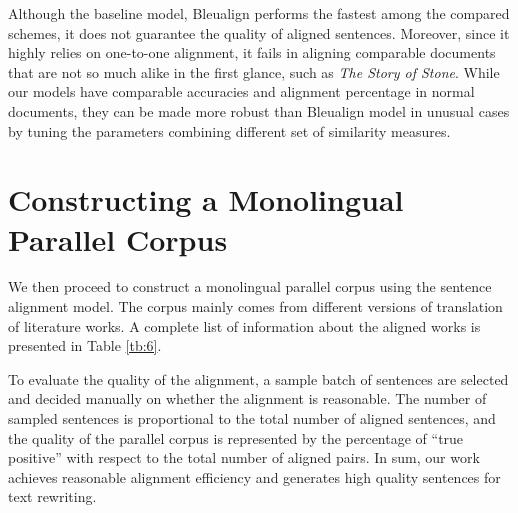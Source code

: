 \documentclass[runningheads]{llncs}
\begin{document}
Although the baseline model, Bleualign performs the fastest among the compared schemes, it does not guarantee the quality of aligned sentences. Moreover, since it highly relies on one-to-one alignment, it fails in aligning comparable documents that are not so much alike in the first glance, such as \emph{The Story of Stone}. While our models have comparable accuracies and alignment percentage in normal documents, they can be made more robust than Bleualign model in unusual cases by tuning the parameters combining different set of similarity measures.

\section{Constructing a Monolingual Parallel Corpus}

We then proceed to construct a monolingual parallel corpus using the sentence alignment model. The corpus mainly comes from different versions of translation of literature works. A complete list of information about the aligned works is presented in Table \ref{tb:6}.

To evaluate the quality of the alignment, a sample batch of sentences are selected and decided manually on whether the alignment is reasonable. The number of sampled sentences is proportional to the total number of aligned sentences, and the quality of the parallel corpus is represented by the percentage of ``true positive'' with respect to the total number of aligned pairs. In sum, our work achieves reasonable alignment efficiency and generates high quality sentences for text rewriting.
\end{document}
